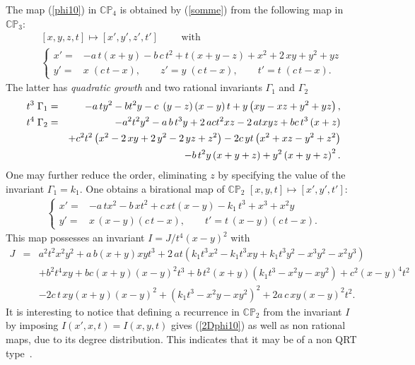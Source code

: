 \documentclass[reqno]{amsart}
\numberwithin{equation}{section}
\numberwithin{figure}{section}
\begin{document}
The map (\ref{phi10}) in $\mathbb C \mathbb P_4$ is obtained by
(\ref{somme}) from the following map in $\mathbb C \mathbb P_3$:
\begin{eqnarray}
&&  [x,y,z,t]\mapsto [x',y',z',t'] \qquad \mbox{  with} \nonumber \\
&&  \begin{cases}
    x' = & - a\, t \left( x+y \right) -b\, c \, {t}^{2}+t \left( x+y-z \right) 
    +{x}^{2}+2\,xy+{y}^{2}+yz \\
    y' = & x\; \left( c\, t-x \right), \qquad
z' = y \; \left( c\, t-x \right), \qquad
t'=  t \; \left( c\, t-x \right) .
 \end{cases} 
  \end{eqnarray}
The latter has {\em quadratic growth} and two rational invariants $\Gamma_1$
and $\Gamma_2$
\begin{eqnarray*}
  t^3\; \Gamma_1& =& -a\, t{y}^{2}-b{t}^{2}y- c\;\left( y-z \right)
  \left( x-y \right) t+y \left( xy-xz+{y}^{2}+yz \right) ,
\\
t^4 \; \Gamma_2 &=&
-{a}^{2}{t}^{2}{y}^{2}-a\, b\, {t}^{3}y+2\,ac{t}^{2}xz-2\,atxyz
+ b c\, {t}^{3} \left( x+  z \right)
  \\
\hskip -1truecm  &&
  +c^2 {t}^{2} \left( {x}^{2}-2\,xy+2
  \,{y}^{2}-2\,yz+{z}^{2} \right)
  -2 c\,yt \left( {x}^{2}+xz-{y}^{2}+{z} ^{2} \right)
  \\
  &&
  -b \,{t}^{2}y \left( x+y+z \right)
  +{y}^{2} \left( x+y+z \right) ^{2}  .
\end{eqnarray*}
One may further reduce the order, eliminating $z$ by specifying the
value of the invariant $\Gamma_1 = k_1$. One obtains a birational map of
$\mathbb C \mathbb P_2$ $[x,y,t]\mapsto [x',y',t']$:
\begin{eqnarray}  \label{2Dphi10}
  \begin{cases}
     x' = & - a\, t{x}^{2}- b \,x {t}^{2}+ c \,x t \left( x-y \right) -k_1\,{t}^{3}+{x}^{3}+{x}^{2}y
\\
    y' = & x\, \left(x -y \right)  \left( c\, t-x \right), 
\qquad
    t' =  t \, \left( x-y \right)  \left( c\, t-x \right). 
  \end{cases}
\end{eqnarray}
This map possesses  an invariant $I= J/ t^4( x-y)^2$   with 
\begin{eqnarray*}
  J &=& {a}^{2}{t}^{2}{x}^{2}{y}^{2}+a\, b \left( x+y \right)x y{t}^{3}
+ 2\,a t \left( k_1{t}^{3}{x}^{2}-k_1{t}^{3}xy+k_1{t}^{3}{y
}^{2}-{x}^{3}{y}^{2}-{x}^{2}{y}^{3} \right)
\\
&& +{b}^{2}{t}^{4}xy
+ b c \left( x+y \right)  \left(x -y \right) ^{2}{t}^{3}
+b\, {t}^{2} \left( x+y \right)  \left( k_1{t}^{3}-{x}^{2}y-x{y}^{2} \right)
+ c^2 \left( x-y \right) ^{4}{t}^{   2}
 \\
 &&
 -2 c\, t \,xy \left( x+y \right)  \left(x -y \right) ^{2}+ \left( k_1{t}
^{3}-{x}^{2}y-x{y}^{2} \right) ^{2}
 +2 a \, c \,xy \left(x - y \right) ^{2}{t}^{2}.
\end{eqnarray*}
It is interesting to notice that defining a recurrence in $\mathbb C \mathbb P_2$ from
the invariant $I$ by imposing $I(x',x,t)=I(x,y,t)$ gives
(\ref{2Dphi10}) as well as non rational maps, due to its degree
distribution. This indicates that it may be of a non QRT
type~\cite{Du10}.
\end{document}
